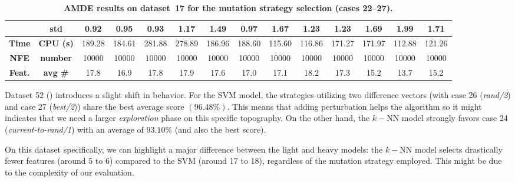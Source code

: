 \documentclass[12pt, openany]{article}
\begin{document}
\begin{table}[H]
{\begin{tabular}{|c | c | c c c c c c | c c c c c c |}
        & \textbf{std}   & 0.92 & 0.95 & 0.93 & 1.17 & 1.49 & 0.97 & 1.67 & 1.23 & 1.23 & 1.69 & 1.99 & 1.71 \\ \hline
        \textbf{Time} & \textbf{CPU (s)} & 189.28 & 184.61 & 281.88 & 278.89 & 186.96 & 188.60 & 115.60 & 116.86 & 171.27 & 171.97 & 112.88 & 121.26 \\ \hline
        \textbf{NFE} & \textbf{number} & 10000 & 10000 & 10000 & 10000 & 10000 & 10000 & 10000 & 10000 & 10000 & 10000 & 10000 & 10000 \\ \hline
        \textbf{Feat.} & \textbf{avg \#} & 17.8 & 16.9 & 17.8 & 17.9 & 17.6 & 17.0 & 17.1 & 18.2 & 17.3 & 15.2 & 13.7 & 15.2 \\ \hline
    \end{tabular}
    }
    \caption{\textbf{AMDE results on dataset~17 for the mutation strategy selection (cases 22--27).}}
    \label{tab:results_AMDE_strategy_d17}
\end{table}

Dataset 52 () introduces a slight shift in behavior. For the SVM model, the strategies utilizing two difference vectors (with case 26 (\textit{rand/2}) and case 27 (\textit{best/2})) share the best average score $(96.48\%)$. This means that adding perturbation helps the algorithm so it might indicates that we need a larger \emph{exploration} phase on this specific topography. On the other hand, the $k-$NN model strongly favors case 24 (\textit{current-to-rand/1}) with an average of $93.10\%$ (and also the best score).

On this dataset specifically, we can highlight a major difference between the light and heavy models: the $k-$NN model selects drastically fewer features (around 5 to 6) compared to the SVM (around 17 to 18), regardless of the mutation strategy employed. This might be due to the complexity of our evaluation.
\end{document}
